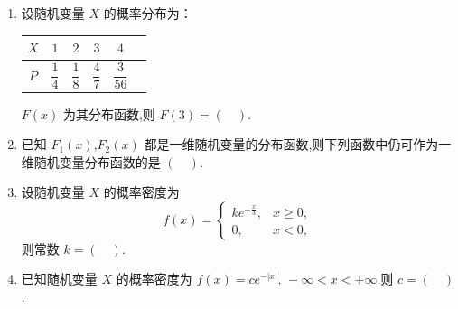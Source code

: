 \begin{enumerate}
\item 设随机变量 $X$ 的概率分布为：
\begin{center}
\begin{tabular}{cccccc}
\toprule
$X$ & $1$ & $2$ & $3$ & $4$ \\
\midrule
$P$ & $\dfrac{1}{4}$ & $\dfrac{1}{8}$ & $\dfrac{4}{7}$ & $\dfrac{3}{56}$ \\
\bottomrule
\end{tabular}
\end{center}
$F(x)$ 为其分布函数,则 $F(3)=(\quad)$.

\item 已知 $F_1(x)$,$F_2(x)$ 都是一维随机变量的分布函数,则下列函数中仍可作为一维随机变量分布函数的是 $(\quad)$.

\item 设随机变量 $X$ 的概率密度为
\[
f(x)=
\begin{cases}
ke^{-\frac{x}{3}}, & x\ge 0,\\
0, & x<0,
\end{cases}
\]
则常数 $k=(\quad)$.

\item 已知随机变量 $X$ 的概率密度为 $f(x)=ce^{-|x|},\,-\infty<x<+\infty$,则 $c=(\quad)$.


\end{enumerate}
